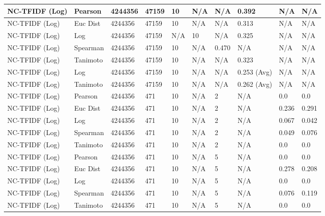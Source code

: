 \documentclass{article}
\begin{document}
\begin{longtable}{ |p{1.7cm}|p{1.9cm}|p{1.5cm}|p{1.5cm}|p{0.75cm}|p{0.75cm}|p{0.75cm}|p{0.75cm}|p{1.5cm}|p{1.5cm}|}
    NC-TFIDF (Log) & Pearson & 4244356 & 47159 & 10 & N/A & N/A & 0.392 & N/A & N/A  \\ \hline
    NC-TFIDF (Log) & Euc Dist & 4244356 & 47159 & 10 & N/A & N/A & 0.313 & N/A & N/A   \\ \hline
    NC-TFIDF (Log) & Log & 4244356 & 47159 & N/A &  10 & N/A& 0.325 & N/A & N/A  \\ \hline
    NC-TFIDF (Log) & Spearman & 4244356 & 47159 & 10 & N/A & 0.470 & N/A & N/A & N/A \\ \hline
    NC-TFIDF (Log) & Tanimoto & 4244356 & 47159 & 10 & N/A& N/A & 0.323 & N/A & N/A \\ \hline
    NC-TFIDF (Log) & Log & 4244356 & 47159 & 10 & N/A& N/A & 0.253 (Avg) & N/A & N/A \\ \hline
    NC-TFIDF (Log) & Tanimoto & 4244356 & 47159 & 10 & N/A & N/A & 0.262 (Avg) & N/A & N/A \\ \hline
    
    NC-TFIDF (Log)  & Pearson & 4244356 & 471 & 10 & N/A  & 2 & N/A & 0.0 & 0.0  \\ \hline
    NC-TFIDF (Log)  & Euc Dist & 4244356 & 471 & 10 & N/A  & 2 & N/A &0.236 & 0.291   \\ \hline
    NC-TFIDF (Log)  & Log & 4244356 & 471 & 10 & N/A & 2 & N/A & 0.067 & 0.042  \\ \hline
    NC-TFIDF (Log)  & Spearman & 4244356 & 471 & 10 & N/A  & 2 & N/A &0.049 & 0.076 \\ \hline
    NC-TFIDF (Log)  & Tanimoto & 4244356 & 471 & 10 & N/A  & 2 & N/A & 0.0 & 0.0 \\ \hline
    
    NC-TFIDF (Log)  & Pearson & 4244356 & 471 & 10 & N/A  & 5 & N/A & 0.0 & 0.0  \\ \hline
    NC-TFIDF (Log)  & Euc Dist & 4244356 & 471 & 10 & N/A  & 5 & N/A &0.278 & 0.208   \\ \hline
    NC-TFIDF (Log)  & Log & 4244356 & 471 & 10 & N/A & 5 & N/A & 0.0 & 0.0  \\ \hline
    NC-TFIDF (Log)  & Spearman & 4244356 & 471 & 10 & N/A  & 5 & N/A &0.076 & 0.119 \\ \hline
    NC-TFIDF (Log)  & Tanimoto & 4244356 & 471 & 10 & N/A  & 5 & N/A & 0.0 & 0.0 \\ \hline
    

\end{longtable}
\end{document}
